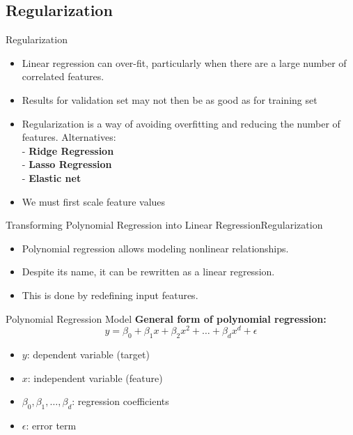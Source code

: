 \documentclass[11pt]{beamer}
\begin{document}
\subsection[subsection]{Regularization}
%
\begin{frame}{Regularization}
	\begin{itemize}
		\item Linear regression can over-fit, particularly when there are a large number of correlated features.
		\item Results for validation set may not then be as good as for training set
		\item Regularization is a way of avoiding overfitting and reducing the number of features. Alternatives: \\
		\vspace{0.1cm}
		- \textbf{Ridge Regression} \\ 
		\vspace{0.1cm}
		- \textbf{Lasso Regression} \\
		\vspace{0.1cm}
		- \textbf{Elastic net} \\
		
\item We must first scale feature values
	\end{itemize}
\end{frame}
%
%
\begin{frame}{Transforming Polynomial Regression into Linear Regression}{Regularization}
    \begin{itemize}
        \item Polynomial regression allows modeling nonlinear relationships.
        \item Despite its name, it can be rewritten as a linear regression.
        \item This is done by redefining input features.
    \end{itemize}
\end{frame}
%
%
\begin{frame}{Polynomial Regression Model}
    \textbf{General form of polynomial regression:}
    \begin{equation}
        y = \beta_0 + \beta_1 x + \beta_2 x^2 + \dots + \beta_d x^d + \epsilon
    \end{equation}
    \begin{itemize}
        \item $y$: dependent variable (target)
        \item $x$: independent variable (feature)
        \item $\beta_0, \beta_1, \dots, \beta_d$: regression coefficients
        \item $\epsilon$: error term
    \end{itemize}
\end{frame}
\end{document}
